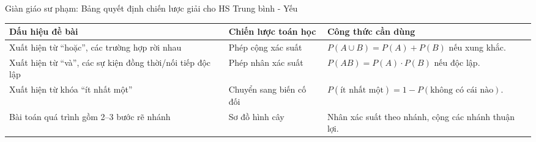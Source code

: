 \documentclass[12pt, a4paper]{article}
\begin{document}
\begin{scaffoldbox}{Giàn giáo sư phạm: Bảng quyết định chiến lược giải cho HS Trung bình - Yếu}
\begin{center}
\small
\begin{tabularx}{\linewidth}{|l|l|X|}
\hline
\textbf{Dấu hiệu đề bài} & \textbf{Chiến lược toán học} & \textbf{Công thức cần dùng} \\ \hline
Xuất hiện từ ``hoặc'', các trường hợp rời nhau & Phép cộng xác suất & $P(A \cup B) = P(A) + P(B)$ nếu xung khắc. \\ \hline
Xuất hiện từ ``và'', các sự kiện đồng thời/nối tiếp độc lập & Phép nhân xác suất & $P(AB) = P(A) \cdot P(B)$ nếu độc lập. \\ \hline
Xuất hiện từ khóa ``ít nhất một'' & Chuyển sang biến cố đối & $P(\text{ít nhất một}) = 1 - P(\text{không có cái nào})$. \\ \hline
Bài toán quá trình gồm 2--3 bước rẽ nhánh & Sơ đồ hình cây & Nhân xác suất theo nhánh, cộng các nhánh thuận lợi. \\ \hline
\end{tabularx}
\end{center}
\end{scaffoldbox}
\end{document}
